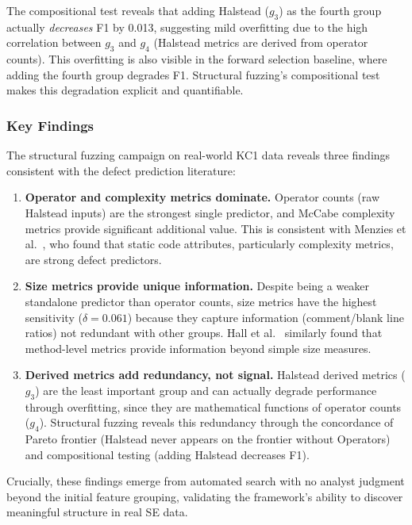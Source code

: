 \documentclass[manuscript,review,anonymous]{acmart}
\begin{document}
The compositional test reveals that adding Halstead ($g_3$) as the fourth group actually \emph{decreases} F1 by 0.013, suggesting mild overfitting due to the high correlation between $g_3$ and $g_4$ (Halstead metrics are derived from operator counts).
This overfitting is also visible in the forward selection baseline, where adding the fourth group degrades F1.
Structural fuzzing's compositional test makes this degradation explicit and quantifiable.

\subsubsection{Key Findings}

The structural fuzzing campaign on real-world KC1 data reveals three findings consistent with the defect prediction literature:

\begin{enumerate}
    \item \textbf{Operator and complexity metrics dominate.} Operator counts (raw Halstead inputs) are the strongest single predictor, and McCabe complexity metrics provide significant additional value. This is consistent with Menzies et al.~\cite{menzies2007}, who found that static code attributes, particularly complexity metrics, are strong defect predictors.
    \item \textbf{Size metrics provide unique information.} Despite being a weaker standalone predictor than operator counts, size metrics have the highest sensitivity ($\delta = 0.061$) because they capture information (comment/blank line ratios) not redundant with other groups. Hall et al.~\cite{hall2012} similarly found that method-level metrics provide information beyond simple size measures.
    \item \textbf{Derived metrics add redundancy, not signal.} Halstead derived metrics ($g_3$) are the least important group and can actually degrade performance through overfitting, since they are mathematical functions of operator counts ($g_4$). Structural fuzzing reveals this redundancy through the concordance of Pareto frontier (Halstead never appears on the frontier without Operators) and compositional testing (adding Halstead decreases F1).
\end{enumerate}

Crucially, these findings emerge from automated search with no analyst judgment beyond the initial feature grouping, validating the framework's ability to discover meaningful structure in real SE data.
\end{document}
